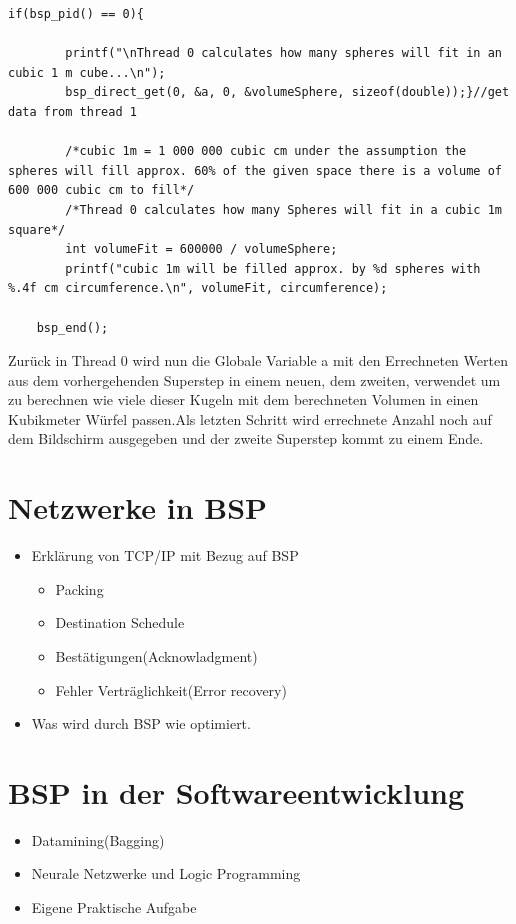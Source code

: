 \documentclass[a4paper,10pt]{scrartcl}
\begin{document}
\begin{lstlisting}
if(bsp_pid() == 0){
    
	    printf("\nThread 0 calculates how many spheres will fit in an cubic 1 m cube...\n");                 
        bsp_direct_get(0, &a, 0, &volumeSphere, sizeof(double));}//get data from thread 1     
    
        /*cubic 1m = 1 000 000 cubic cm under the assumption the spheres will fill approx. 60% of the given space there is a volume of 600 000 cubic cm to fill*/
        /*Thread 0 calculates how many Spheres will fit in a cubic 1m square*/
        int volumeFit = 600000 / volumeSphere;
        printf("cubic 1m will be filled approx. by %d spheres with %.4f cm circumference.\n", volumeFit, circumference);
    
    bsp_end();
\end{lstlisting}
Zurück in Thread 0 wird nun die Globale Variable a mit den Errechneten Werten aus dem vorhergehenden Superstep in einem neuen, dem	 zweiten,  verwendet um zu berechnen wie viele dieser Kugeln mit dem berechneten Volumen in einen Kubikmeter Würfel passen.Als letzten Schritt wird errechnete Anzahl noch auf dem Bildschirm ausgegeben und der zweite Superstep kommt zu einem Ende.	
\newpage



\section{Netzwerke in BSP}
\begin{itemize}
\item Erklärung von TCP/IP mit Bezug auf BSP
\begin{itemize}
\item Packing
\item Destination Schedule
\item Bestätigungen(Acknowladgment)
\item Fehler Verträglichkeit(Error recovery)
\end{itemize}
\item Was wird durch BSP wie optimiert.

\end{itemize}
\section{BSP in der Softwareentwicklung}
\begin{itemize}
\item Datamining(Bagging)
\item Neurale Netzwerke und Logic Programming
\item Eigene Praktische Aufgabe
\end{itemize}
\end{document}
